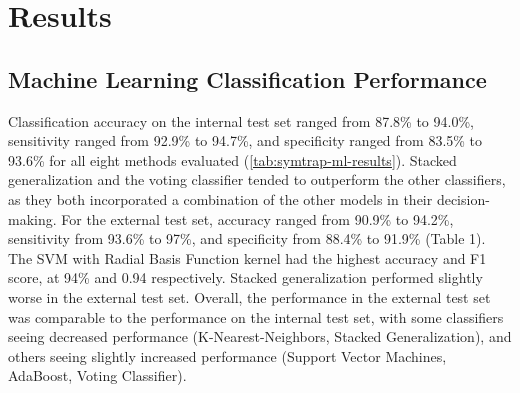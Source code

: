\section{Results}
\subsection{Machine Learning Classification Performance}
Classification accuracy on the internal test set ranged from 87.8\% to 94.0\%, sensitivity ranged from 92.9\% to 94.7\%, and specificity ranged from 83.5\% to 93.6\% for all eight methods evaluated (\cref{tab:symtrap-ml-results}).
Stacked generalization and the voting classifier tended to outperform the other classifiers, as they both incorporated a combination of the other models in their decision-making.
For the external test set, accuracy ranged from 90.9\% to 94.2\%, sensitivity from 93.6\% to 97\%, and specificity from 88.4\% to 91.9\%  (Table 1).
The SVM with Radial Basis Function kernel had the highest accuracy and F1 score, at 94\% and 0.94 respectively. Stacked generalization performed slightly worse in the external test set.
Overall, the performance in the external test set was comparable to the performance on the internal test set, with some classifiers seeing decreased performance (K-Nearest-Neighbors, Stacked Generalization), and others seeing slightly increased performance (Support Vector Machines, AdaBoost, Voting Classifier).


